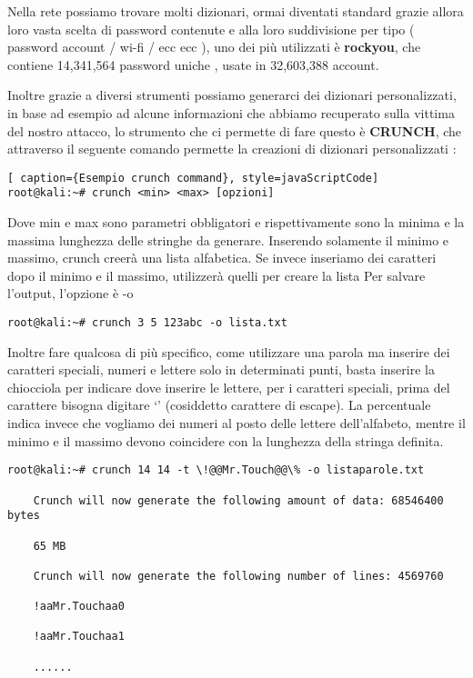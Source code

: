 Nella rete possiamo trovare molti dizionari, ormai diventati standard grazie allora loro vasta scelta di password contenute e alla loro suddivisione per tipo ( password account / wi-fi / ecc ecc ), uno dei più utilizzati è \textbf{rockyou}, che contiene 14,341,564 password uniche , usate in 32,603,388 account.

Inoltre grazie a diversi strumenti possiamo generarci dei dizionari personalizzati, in base ad esempio ad alcune informazioni che abbiamo recuperato sulla vittima del nostro attacco, lo strumento che ci permette di fare questo è \textbf{CRUNCH}\cite{CRUNCH}, che attraverso il seguente comando permette la creazioni di dizionari personalizzati :
\begin{lstlisting}[ caption={Esempio crunch command}, style=javaScriptCode]
root@kali:~# crunch <min> <max> [opzioni]
\end{lstlisting}
Dove min e max sono parametri obbligatori e rispettivamente sono la minima e la massima lunghezza delle stringhe da generare.
Inserendo solamente il minimo e massimo, crunch creerà una lista alfabetica.
Se invece inseriamo dei caratteri dopo il minimo e il massimo, utilizzerà quelli per creare la lista
Per salvare l’output, l’opzione è -o
\begin{lstlisting}[caption={Esempio crunch command}, style=javaScriptCode]
root@kali:~# crunch 3 5 123abc -o lista.txt
\end{lstlisting}
Inoltre fare qualcosa di più specifico, come utilizzare una parola ma inserire dei caratteri speciali, numeri e lettere solo in determinati punti, basta inserire la chiocciola per indicare dove inserire le lettere, per i caratteri speciali, prima del carattere bisogna digitare ‘’ (cosiddetto carattere di escape). La percentuale indica invece che vogliamo dei numeri al posto delle lettere dell’alfabeto, mentre il minimo e il massimo devono coincidere con la lunghezza della stringa definita.
\begin{lstlisting}[caption={Esempio crunch command}, style=javaScriptCode]
root@kali:~# crunch 14 14 -t \!@@Mr.Touch@@\% -o listaparole.txt

    Crunch will now generate the following amount of data: 68546400 bytes

    65 MB

    Crunch will now generate the following number of lines: 4569760

    !aaMr.Touchaa0

    !aaMr.Touchaa1

    ......
\end{lstlisting}
